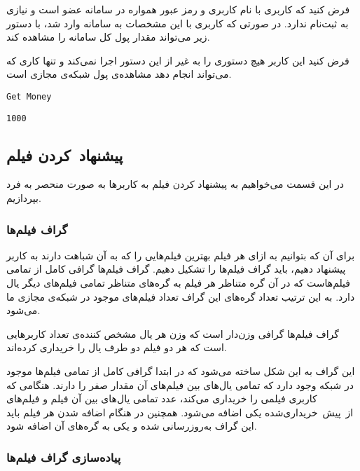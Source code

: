 \documentclass{utap}
\begin{document}
    فرض کنید که کاربری با نام کاربری  و رمز عبور  همواره در سامانه عضو است و نیازی به ثبت‌نام ندارد. در صورتی که کاربری با این مشخصات به سامانه وارد شد، با دستور زیر می‌تواند مقدار پول کل سامانه را مشاهده کند.

    فرض کنید این کاربر هیچ دستوری را به غیر از این دستور اجرا نمی‌کند و تنها کاری که می‌تواند انجام دهد مشاهده‌ی پول شبکه‌ی مجازی است.

    \begin{latin}
        \begin{Verbatim}[frame=lines,label={\rl{دستور ورودی}}]
Get Money
        \end{Verbatim}
        \begin{Verbatim}[frame=lines,label={\rl{خروجی}}]
1000
        \end{Verbatim}
    \end{latin}

    \subsection{پیشنهاد~کردن فیلم}

    در این قسمت می‌خواهیم به پیشنهاد کردن فیلم به کاربر‌ها به صورت منحصر به فرد بپردازیم.

    \subsubsection{گراف فیلم‌ها}

    برای آن ‌که بتوانیم به ازای هر فیلم بهترین فیلم‌هایی را که به آن شباهت دارند به کاربر پیشنهاد دهیم، باید گراف فیلم‌ها را تشکیل دهیم. گراف فیلم‌ها گرافی کامل از تمامی فیلم‌هاست که در آن گره متناظر هر فیلم به گره‌های متناظر تمامی فیلم‌های دیگر یال دارد. به این ترتیب تعداد گره‌های این گراف تعداد فیلم‌های موجود در شبکه‌ی مجازی ما می‌شود.

    گراف فیلم‌‌ها گرافی وزن‌دار است که وزن هر یال مشخص کننده‌ی تعداد کاربر‌هایی است که هر دو فیلم دو طرف یال را خریداری  کرده‌اند.

    این گراف به این شکل ساخته می‌شود که در ابتدا گرافی کامل از تمامی فیلم‌ها موجود در شبکه وجود دارد که تمامی یال‌های بین فیلم‌های آن مقدار صفر را دارند. هنگامی که کاربری فیلمی را خریداری می‌کند، عدد تمامی یال‌های بین آن فیلم و فیلم‌های از~پیش~خریداری‌شده یکی اضافه می‌شود. همچنین در هنگام اضافه شدن هر فیلم باید این گراف به‌روز‌رسانی شده و یکی به گره‌های آن اضافه شود.

    \subsubsection{پیاده‌سازی گراف فیلم‌ها}
\end{document}
